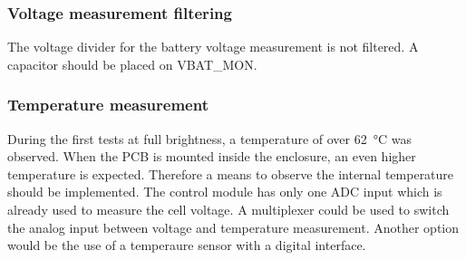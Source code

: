 \subsubsection{Voltage measurement filtering}
The voltage divider for the battery voltage measurement is not filtered. A capacitor should be placed on VBAT\_MON. 

\subsubsection{Temperature measurement}
During the first tests at full brightness, a temperature of over \qty{62}{\celsius} was observed. When the \ac{PCB} is mounted inside the enclosure, an even higher temperature is expected. Therefore a means to observe the internal temperature should be implemented. The control module has only one \ac{ADC} input which is already used to measure the cell voltage. A multiplexer could be used to switch the analog input between voltage and temperature measurement. Another option would be the use of a temperaure sensor with a digital interface. 
